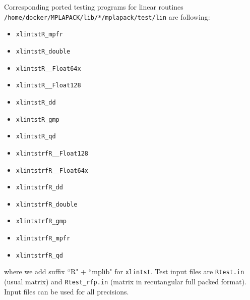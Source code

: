 \documentclass[12pt]{article}
\begin{document}
Corresponding ported testing programs for linear routines \\
{\tt /home/docker/MPLAPACK/lib/*/mplapack/test/lin} are following:
\begin{itemize}
    \item {\tt xlintstR\_mpfr}
    \item {\tt xlintstR\_double}
    \item {\tt xlintstR\_\_Float64x}
    \item {\tt xlintstR\_\_Float128}
    \item {\tt xlintstR\_dd}
    \item {\tt xlintstR\_gmp}
    \item {\tt xlintstR\_qd}
   \item {\tt xlintstrfR\_\_Float128}
   \item {\tt xlintstrfR\_\_Float64x}
   \item {\tt xlintstrfR\_dd}
   \item {\tt xlintstrfR\_double}
   \item {\tt xlintstrfR\_gmp}
   \item {\tt xlintstrfR\_mpfr}
   \item {\tt xlintstrfR\_qd}
   \end{itemize}
where we add suffix ``R" + ``mplib" for {\tt xlintst}.
Test input files are {\tt Rtest.in} (usual matrix) and {\tt Rtest\_rfp.in} (matrix in recutangular full packed format).
Input files can be used for all precisions.
\end{document}
